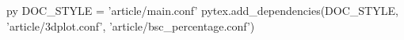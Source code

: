\usepackage[explicit]{titlesec}
%
\titlespacing{\section}{0em}{1.5em}{0.4em}
%
\titlespacing{\subsection}{0em}{1em}{0.2em}
%
\titlespacing{\subsubsection}{0em}{0.75em}{0em}

\usepackage[autoprint=false, gobble=auto, pyfuture=all]{pythontex} %
\usepackage{pgf} %


\begin{pythontexcustomcode}[begin]{py}
DOC_STYLE = 'article/main.conf'
pytex.add_dependencies(DOC_STYLE, 'article/3dplot.conf', 'article/bsc_percentage.conf')
\end{pythontexcustomcode}



\setlength{\columnsep}{7mm}


%
